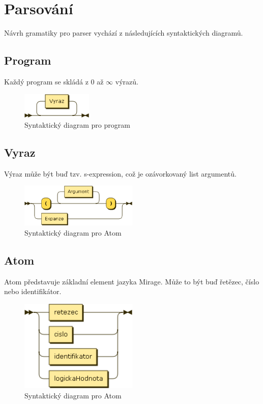 \documentclass[a4paper,11pt]{article}
\begin{document}



\section{Parsování}
Návrh gramatiky pro parser vychází z následujících syntaktických diagramů.
\newpage
\subsection{Program}
Každý program se skládá z 0 až $\infty$ výrazů.

\begin{figure}[!h]
    \centering
    \includegraphics[width=0.3\textwidth]{obrazky/Program.png}
    \caption{Syntaktický diagram pro program}
    \label{fig:Syntaktický diagram pro program}
\end{figure}

\subsection{Vyraz}
Výraz může být buď tzv. s-expression, což je ozávorkovaný list argumentů.

\begin{figure}[!h]
    \centering
    \includegraphics[width=0.5\textwidth]{obrazky/Vyraz.png}
    \caption{Syntaktický diagram pro Atom}
    \label{fig:Syntaktický diagram pro Atom}
\end{figure}
\subsection{Atom}
Atom představuje základní element jazyka Mirage. Může to být buď řetězec, číslo nebo identifikátor.
\begin{figure}[!h]
    \centering
    \includegraphics[width=0.5\textwidth]{obrazky/Atom.png}
    \caption{Syntaktický diagram pro Atom}
    \label{fig:Syntaktický diagram pro Atom}
\end{figure}
\end{document}
